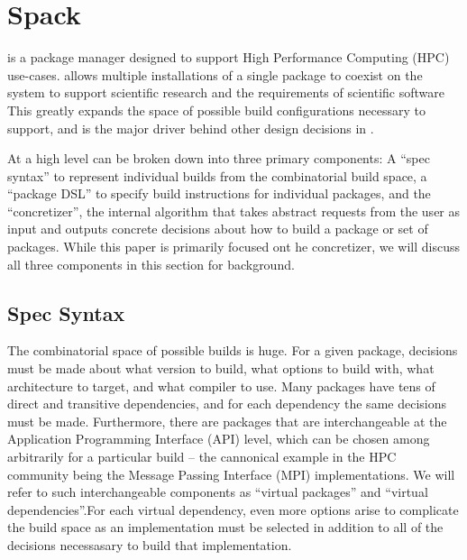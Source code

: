 \section{Spack}
\label{sec:software-model}

\spack{} is a package manager designed to support High Performance Computing (HPC) use-cases.
\spack{} allows multiple installations of a single package to coexist on the system to support scientific research and the requirements of scientific software This greatly expands the space of possible build configurations necessary to support, and is the major driver behind other design decisions in \spack{}.

At a high level \spack{} can be broken down into three primary components: A ``spec syntax'' to represent individual builds from the combinatorial build space, a ``package DSL'' to specify build instructions for individual packages, and the ``concretizer'', the internal algorithm that takes abstract requests from the user as input and outputs concrete decisions about how to build a package or set of packages. While this paper is primarily focused ont he concretizer, we will discuss all three components in this section for background.

\subsection{Spec Syntax}

The combinatorial space of possible \spack{} builds is huge. For a given package, decisions must be made about what version to build, what options to build with, what architecture to target, and what compiler to use. Many packages have tens of direct and transitive dependencies, and for each dependency the same decisions must be made. Furthermore, there are packages that are interchangeable at the Application Programming Interface (API) level, which can be chosen among arbitrarily for a particular build -- the cannonical example in the HPC community being the Message Passing Interface (MPI) implementations. We will refer to such interchangeable components as ``virtual packages'' and ``virtual dependencies''.For each virtual dependency, even more options arise to complicate the build space as an implementation must be selected in addition to all of the decisions necessasary to build that implementation.

